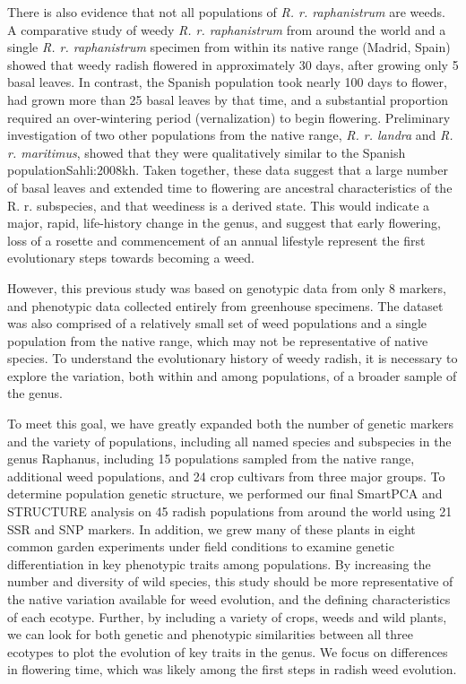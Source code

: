 \documentclass[twocolumn]{bmcart}%
\begin{document}
There is also evidence that not all populations of \textit{R. r. raphanistrum} are weeds. A comparative study of weedy \textit{R. r. raphanistrum} from around the world and a single \textit{R. r. raphanistrum} specimen from within its native range (Madrid, Spain) showed that weedy radish flowered in approximately 30 days, after growing only 5 basal leaves. In contrast, the Spanish population took nearly 100 days to flower, had grown more than 25 basal leaves by that time, and a substantial proportion required an over-wintering period (vernalization) to begin flowering. Preliminary investigation of two other populations from the native range, \textit{R. r. landra} and \textit{R. r. maritimus}, showed that they were qualitatively similar to the Spanish population{Sahli:2008kh}. Taken together, these data suggest that a large number of basal leaves and extended time to flowering are ancestral characteristics of the R. r. subspecies, and that weediness is a derived state. This would indicate a major, rapid, life-history change in the genus, and suggest that early flowering, loss of a rosette and commencement of an annual lifestyle represent the first evolutionary steps towards becoming a weed.

However, this previous study was based on genotypic data from only 8 markers, and phenotypic data collected entirely from greenhouse specimens. The dataset was also comprised of a relatively small set of weed populations and a single population from the native range, which may not be representative of native species. To understand the evolutionary history of weedy radish, it is necessary to explore the variation, both within and among populations, of a broader sample of the genus.

To meet this goal, we have greatly expanded both the number of genetic markers and the variety of populations, including all named species and subspecies in the genus Raphanus, including 15 populations sampled from the native range, additional weed populations, and 24 crop cultivars from three major groups. To determine population genetic structure, we performed our final SmartPCA and STRUCTURE analysis on 45 radish populations from around the world using 21 SSR and SNP markers. In addition, we grew many of these plants in eight common garden experiments under field conditions to examine genetic differentiation in key phenotypic traits among populations. By increasing the number and diversity of wild species, this study should be more representative of the native variation available for weed evolution, and the defining characteristics of each ecotype. Further, by including a variety of crops, weeds and wild plants, we can look for both genetic and phenotypic similarities between all three ecotypes to plot the evolution of key traits in the genus. We focus on differences in flowering time, which was likely among the first steps in radish weed evolution. 
\end{document}
